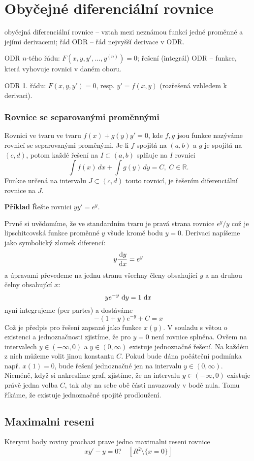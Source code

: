 
\chapter{Obyčejné diferenciální rovnice}
obyčejná diferenciální rovnice -- vztah mezi neznámou funkcí jedné proměnné a jejími derivacemi;
řád ODR -- řád nejvyšší derivace v ODR.

ODR $n$-tého řádu: $F(x,y,y',\ldots,y^{(n)})=0$;
řešení (integrál) ODR -- funkce, která vyhovuje rovnici v daném oboru.

ODR 1. řádu: $F(x,y,y')=0$, resp. $y'=f(x,y)$ (rozřešená vzhledem k derivaci).

\subsection{Rovnice se separovanými proměnnými}
   Rovnici ve tvaru ve tvaru $f(x)+g(y)y'=0$, kde $f,g$ jsou funkce nazýváme
   rovnicí se separovanými proměnými.
   Je-li $f$ spojitá na $(a,b)$ a $g$ je spojitá na $(c,d)$,
   potom každé řešení na $I\subset(a,b)$ splňuje na $I$ rovnici
   \[
      \int f(x)\,dx + \int g(y)\,dy = C, \; C\in\mathbb{R}.
   \]
   Funkce určená na intervalu $J\subset(c,d)$ touto rovnicí, je řešením diferenciální rovnice na $J$.

   {\bf Příklad}
   Řešte rovnici $yy'=e^y$.

   Prvně si uvědomíme, že ve standardním tvaru je pravá strana rovnice $e^y/y$ což je lipschitcovská funkce
   proměnné $y$ všude kromě bodu $y=0$.
   Derivaci napíšeme jako symbolický zlomek diferencí:
   \[
        y\frac{\,{\rm d} y}{\,{\rm d} x}=e^y
   \]
   a úpravami převedeme na jednu stranu všechny členy  obsahující $y$ a na druhou čelny obsahující $x$:
   \[
        ye^{-y}\,\,{\rm d} y=1\,\,{\rm d} x
   \]
   nyní integrujeme (per partes) a dostáváme
   \[
      -(1+y)e^{-y}+C=x
   \]
   Což je předpis pro řešení zapsané jako funkce $x(y)$. V souladu s větou o existenci a jednoznačnosti
   zjistíme, že pro $y=0$ není rovnice splněna. Ovšem na intervalech $y\in(-\infty,0)$ a  $y\in(0,\infty)$
   existuje jednoznačné řešení. Na každém z nich můžeme volit jinou konstantu $C$. Pokud bude dána počáteční
   podmínka např. $x(1)=0$, bude řešení jednoznačné jen na intervalu $y\in(0,\infty)$. Nicméně, když si nakreslíme graf,
   zjistíme, že na intervalu $y\in(-\infty,0)$ existuje právě jedna volba $C$, tak aby na sebe obě části navazovaly
   v bodě nula. Tomu říkáme, že existuje jednoznačné spojité prodloužení.
\section{Maximalni reseni}
Kterymi body roviny prochazi prave jedno maximalni reseni rovnice
\[
  xy'-y=0 ?\quad [R^2\setminus \{x=0\}]
\]


